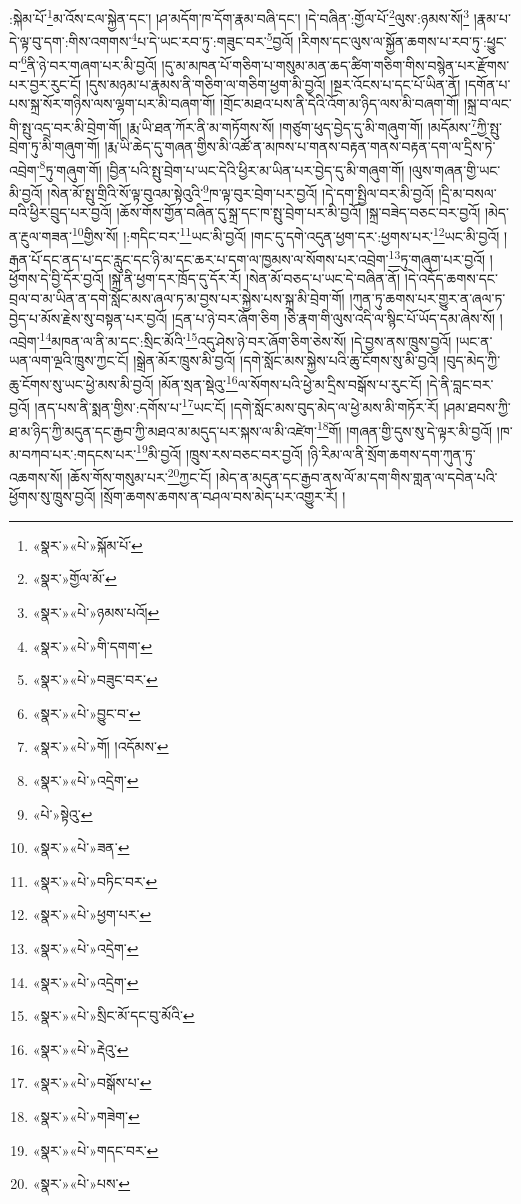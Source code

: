 :སྐེམ་པོ་\footnote{«སྣར་»«པེ་»སྐོམ་པོ་}མ་འོས་ངལ་སྐྱེན་དང་། །ཤ་མདོག་ཁ་དོག་རྣམ་བཞི་དང་། །དེ་བཞིན་:གྱོལ་པོ་\footnote{«སྣར་»གྱོལ་མོ་}ལུས་:ཉམས་སོ།\footnote{«སྣར་»«པེ་»ཉམས་པའོ།} །རྣམ་པ་དེ་ལྟ་བུ་དག་:གིས་འགགས་\footnote{«སྣར་»«པེ་»གི་དགག་}པ་དེ་ཡང་རབ་ཏུ་:གཟུང་བར་\footnote{«སྣར་»«པེ་»བཟུང་བར་}བྱའོ། །རིགས་དང་ལུས་ལ་སྐྱོན་ཆགས་པ་རབ་ཏུ་:ཕྱུང་བ་\footnote{«སྣར་»«པེ་»བྱུང་བ་}ནི་ཉེ་བར་གཞག་པར་མི་བྱའོ། །དུ་མ་མཁན་པོ་གཅིག་པ་གསུམ་མན་ཆད་ཚིག་གཅིག་གིས་བསྙེན་པར་རྫོགས་པར་བྱར་རུང་ངོ། །དུས་མཉམ་པ་རྣམས་ནི་གཅིག་ལ་གཅིག་ཕྱག་མི་བྱའོ། །སྔར་འོངས་པ་དང་པོ་ཡིན་ནོ། །དགོན་པ་པས་སྐྲ་སོར་གཉིས་ལས་ལྷག་པར་མི་བཞག་གོ། །གྲོང་མཐའ་པས་ནི་དེའི་འོག་མ་ཉིད་ལས་མི་བཞག་གོ། །སྐྲ་བ་ལང་གི་སྤུ་འདྲ་བར་མི་བྲེག་གོ། །རྨ་ཡི་ཐན་ཀོར་ནི་མ་གཏོགས་སོ། །གཙུག་ཕུད་བྱེད་དུ་མི་གཞུག་གོ། །མདོམས་\footnote{«སྣར་»«པེ་»གོ། །འདོམས་}ཀྱི་སྤུ་བྲེག་ཏུ་མི་གཞུག་གོ། །རྨ་ཡི་ཆེད་དུ་གཞན་གྱིས་མི་འཚོ་ན་མཁས་པ་གནས་བརྟན་གནས་བརྟན་དག་ལ་དྲིས་ཏེ་འབྲེག་\footnote{«སྣར་»«པེ་»འདྲེག་}ཏུ་གཞུག་གོ། །བྱིན་པའི་སྤུ་བྲེག་པ་ཡང་དེའི་ཕྱིར་མ་ཡིན་པར་བྱེད་དུ་མི་གཞུག་གོ། །ལུས་གཞན་གྱི་ཡང་མི་བྱའོ། །སེན་མོ་སྤུ་གྲིའི་སོ་ལྟ་བུའམ་སྟེའུའི་\footnote{«པེ་»སྟེའུ་}ཁ་ལྟ་བུར་བྲེག་པར་བྱའོ། །དེ་དག་སྤྱིལ་བར་མི་བྱའོ། །དྲི་མ་བསལ་བའི་ཕྱིར་བྲུད་པར་བྱའོ། །ཆོས་གོས་གྱོན་བཞིན་དུ་སྐྲ་དང་ཁ་སྤུ་བྲེག་པར་མི་བྱའོ། །སྐྲ་བཟེད་བཅང་བར་བྱའོ། །མེད་ན་རྔུལ་གཟན་\footnote{«སྣར་»«པེ་»ཟན་}གྱིས་སོ། །:གདིང་བར་\footnote{«སྣར་»«པེ་»བཏིང་བར་}ཡང་མི་བྱའོ། །གང་དུ་དགེ་འདུན་ཕྱག་དར་:ཕྱགས་པར་\footnote{«སྣར་»«པེ་»ཕྱག་པར་}ཡང་མི་བྱའོ། །རྒན་པོ་དང་ནད་པ་དང་རླུང་དང་ཉི་མ་དང་ཆར་པ་དག་ལ་ཁྱམས་ལ་སོགས་པར་འབྲེག་\footnote{«སྣར་»«པེ་»འདྲེག་}ཏུ་གཞུག་པར་བྱའོ། །ཕྱོགས་དེ་བྱི་དོར་བྱའོ། །སྐྲ་ནི་ཕྱག་དར་ཁྲོད་དུ་དོར་རོ། །སེན་མོ་བཅད་པ་ཡང་དེ་བཞིན་ནོ། །དེ་འདོད་ཆགས་དང་བྲལ་བ་མ་ཡིན་ན་དགེ་སློང་མས་ཞལ་ཏ་མ་བྱས་པར་སྐྱེས་པས་སྐྲ་མི་བྲེག་གོ། །ཀུན་ཏུ་ཆགས་པར་གྱུར་ན་ཞལ་ཏ་བྱེད་པ་མོས་རྗེས་སུ་བསྟན་པར་བྱའོ། །དྲན་པ་ཉེ་བར་ཞོག་ཅིག །ཅི་རྣག་གི་ལུས་འདི་ལ་སྙིང་པོ་ཡོད་དམ་ཞེས་སོ། །འབྲེག་\footnote{«སྣར་»«པེ་»འདྲེག་}མཁན་ལ་ནི་མ་དང་:སྲིང་མོའི་\footnote{«སྣར་»«པེ་»སྲིང་མོ་དང་བུ་མོའི་}འདུ་ཤེས་ཉེ་བར་ཞོག་ཅིག་ཅེས་སོ། །དེ་བྱས་ནས་ཁྲུས་བྱའོ། །ཡང་ན་ཡན་ལག་ལྔའི་ཁྲུས་ཀྱང་ངོ། །སྒྲེན་མོར་ཁྲུས་མི་བྱའོ། །དགེ་སློང་མས་སྐྱེས་པའི་ཆུ་ངོགས་སུ་མི་བྱའོ། །བུད་མེད་ཀྱི་ཆུ་ངོགས་སུ་ཡང་ཕྱེ་མས་མི་བྱའོ། །མོན་སྲན་སྡེའུ་\footnote{«སྣར་»«པེ་»རྡེའུ་}ལ་སོགས་པའི་ཕྱེ་མ་དྲིས་བསྒོས་པ་རུང་ངོ། །དེ་ནི་བླང་བར་བྱའོ། །ནད་པས་ནི་སྨན་གྱིས་:དགོས་པ་\footnote{«སྣར་»«པེ་»བསྒོས་པ་}ཡང་ངོ། །དགེ་སློང་མས་བུད་མེད་ལ་ཕྱེ་མས་མི་གཏོར་རོ། །ཤམ་ཐབས་ཀྱི་ཐ་མ་ཉིད་ཀྱི་མདུན་དང་རྒྱབ་ཀྱི་མཐའ་མ་མདུད་པར་སྐས་ལ་མི་འཛེག་\footnote{«སྣར་»«པེ་»གཟེག་}གོ། །གཞན་གྱི་དུས་སུ་དེ་ལྟར་མི་བྱའོ། །ཁ་མ་བཀབ་པར་:གདངས་པར་\footnote{«སྣར་»«པེ་»གདང་བར་}མི་བྱའོ། །ཁྲུས་རས་བཅང་བར་བྱའོ། །ཉི་རིམ་ལ་ནི་སྲོག་ཆགས་དག་ཀུན་ཏུ་འཆགས་སོ། །ཆོས་གོས་གསུམ་པར་\footnote{«སྣར་»«པེ་»པས་}ཀྱང་ངོ། །མེད་ན་མདུན་དང་རྒྱབ་ནས་ལོ་མ་དག་གིས་གླན་ལ་དབེན་པའི་ཕྱོགས་སུ་ཁྲུས་བྱའོ། །སྲོག་ཆགས་ཆགས་ན་བཤལ་བས་མེད་པར་འགྱུར་རོ། །
